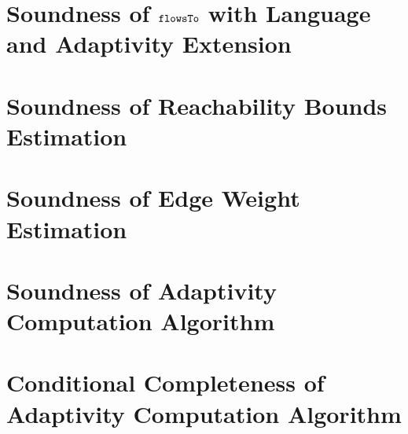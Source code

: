 \documentclass[a4paper,11pt]{article}
\newcommand{\highlight}[1]{\textcolor[rgb]{.0,0.0,1.0}{ #1}}
\begin{document}
\section{Soundness of $\mathtt{flowsTo}$ \highlight{with Language and Adaptivity Extension}}
\label{apdx:flowsto_soundness_extend}

\clearpage
% 
% 
% 
% 
\section{Soundness of Reachability Bounds Estimation}
\label{apdx:reachability_soundness}

\clearpage
\section{\highlight{Soundness of Edge Weight Estimation}}
\label{apdx:edgeweight_soundness}

\clearpage
% 
\section{Soundness of Adaptivity Computation Algorithm}
\label{apdx:adaptalg_soundness}

\section{Conditional Completeness of Adaptivity Computation Algorithm}
\label{apdx:adaptalg_completeness}



\end{document}
